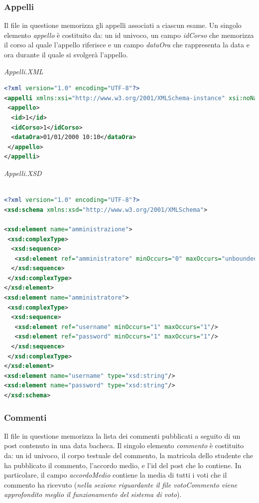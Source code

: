 \documentclass [a4paper,11pt]{book}
\begin{document}
\medskip

\subsubsection{Appelli}

Il file in questione memorizza gli appelli associati a ciascun esame. Un singolo elemento \emph{appello} è costituito da: un id univoco, un campo \emph{idCorso} che memorizza il corso al quale l'appello riferisce e un campo \emph{dataOra} che rappresenta la data e ora durante il quale si svolgerà l'appello.

\medskip

\emph{Appelli.XML}

\begin{lstlisting}[language=XML]
<?xml version="1.0" encoding="UTF-8"?>
<appelli xmlns:xsi="http://www.w3.org/2001/XMLSchema-instance" xsi:noNamespaceSchemaLocation="appelli.xsd">
 <appello>
  <id>1</id>
  <idCorso>1</idCorso>
  <dataOra>01/01/2000 10:10</dataOra>
 </appello>
</appelli>
\end{lstlisting}

\medskip

\emph{Appelli.XSD}

\begin{lstlisting}[language=XML]

<?xml version="1.0" encoding="UTF-8"?>
<xsd:schema xmlns:xsd="http://www.w3.org/2001/XMLSchema">

<xsd:element name="amministrazione">
 <xsd:complexType>
  <xsd:sequence>
   <xsd:element ref="amministratore" minOccurs="0" maxOccurs="unbounded" />
  </xsd:sequence>
 </xsd:complexType>
</xsd:element>
<xsd:element name="amministratore">
 <xsd:complexType>
  <xsd:sequence>
   <xsd:element ref="username" minOccurs="1" maxOccurs="1"/>
   <xsd:element ref="password" minOccurs="1" maxOccurs="1"/>
  </xsd:sequence>
 </xsd:complexType>
</xsd:element>
<xsd:element name="username" type="xsd:string"/>
<xsd:element name="password" type="xsd:string"/>
</xsd:schema>
\end{lstlisting}

\medskip

\subsubsection{Commenti}

Il file in questione memorizza la lista dei commenti pubblicati a seguito di un post contenuto in una data bacheca. Il singolo elemento \emph{commento} è costituito da: un id univoco, il corpo testuale del commento, la matricola dello studente che ha pubblicato il commento, l'accordo medio, e l'id del post che lo contiene. In particolare, il campo \emph{accordoMedio} contiene la media di tutti i voti che il commento ha ricevuto (\emph{nella sezione riguardante il file votoCommento viene approfondito meglio il funzionamento del sistema di voto}).
\end{document}
